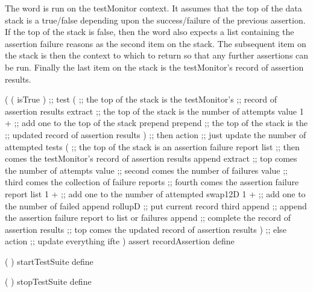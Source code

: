 
The  word is run on the testMonitor context. It 
assumes that the top of the data stack is a true/false depending upon the 
success/failure of the previous assertion. If the top of the stack is 
false, then the  word also expects a list containing 
the assertion failure reasons as the second item on the stack. The 
subsequent item on the stack is then the context to which to return so 
that any further assertions can be run. Finally the last item on the stack 
is the testMonitor's record of assertion results. 

\startJoylolCode
(
  (
    isTrue
  )  ;; test
  (
    ;; the top of the stack is the testMonitor's
    ;; record of assertion results
    extract
    ;; the top of the stack is the number of attempts value
    1 + ;; add one to the top of the stack
    prepend
    prepend
    ;; the top of the stack is the
    ;; updated record of assertion results
  )  ;; then action ;; just update the number of attempted tests 
  (
    ;; the top of the stack is an assertion failure report list
    ;; then comes the testMonitor's record of assertion results
    append
    extract
    ;; top    comes the number of attempts value
    ;; second comes the number of failures value
    ;; third  comes the collection of failure reports
    ;; fourth comes the assertion failure report list
    1 + ;; add one to the number of attempted
    swap12D
    1 + ;; add one to the number of failed
    append
    rollupD ;; put current record third
    append  ;; append the assertion failure report to list or failures
    append  ;; complete the record of assertion results
    ;; top comes the updated record of assertion results
  )  ;; else action ;; update everything
  ifte
)
assert
recordAssertion
define
\stopJoylolCode

\stopTestSuite

\starttyping
{}

\startJoylolCode
  (
  )
  startTestSuite
  define
  
  (
  )
  stopTestSuite
  define
\stopJoylolCode

\stopTestSuite
\stoptyping

\starttyping
{}


\stopTestSuite
\stoptyping

\startTestSuite[assertShouldFail]

\starttyping
\startJoylolCode

